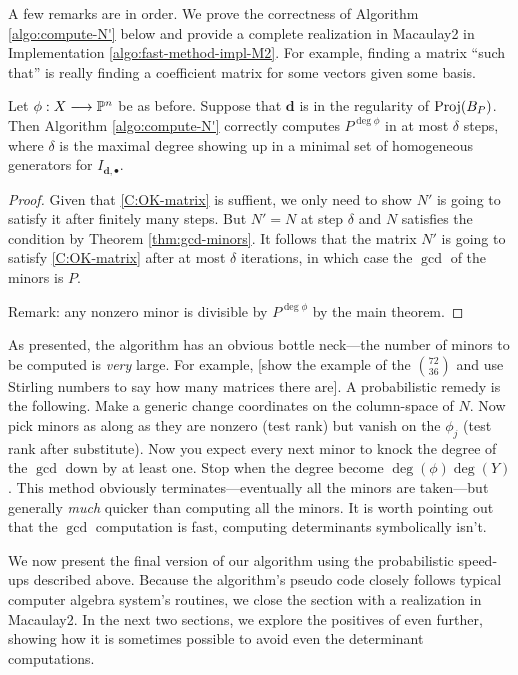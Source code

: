 \documentclass[fleqn,reqno]{amsart}
\numberwithin{first}{chapter}
\begin{document}
\begin{paragraf}
A few remarks are in order.
We prove the correctness of Algorithm \ref{algo:compute-N'} below and provide a complete realization
in Macaulay2 in Implementation \ref{algo:fast-method-impl-M2}.
For example, finding a matrix ``such that'' is really finding a coefficient matrix for some
vectors given some basis.
\end{paragraf}

\begin{theorem}
\label{thm:algo-proof-of-correctness}
Let $\phi:X\longrightarrow\mathbb{P}^n$ be as before. Suppose that $\mathbf d$ is in the regularity of $\operatorname{Proj}(B_P)$.
Then Algorithm \ref{algo:compute-N'} correctly computes $P^{\deg\phi}$
in at most $\delta$ steps, where $\delta$ is the maximal degree showing up in a minimal set of homogeneous
generators for $I_{\mathbf d,\bullet}$.
\end{theorem}

\begin{proof}
Given that \ref{C:OK-matrix} is suffient, we only need to show $N'$ is going to
satisfy it after finitely many steps.
But $N'=N$ at step $\delta$ and $N$ satisfies the condition by Theorem \ref{thm:gcd-minors}.
It follows that the matrix $N'$ is going to satisfy \ref{C:OK-matrix} after at most $\delta$ iterations,
in which case the $\gcd$ of the minors is $P$.

Remark: any nonzero minor is divisible by $P^{\deg\phi}$ by the main theorem.
\end{proof}

\begin{paragraf}
As presented, the algorithm has an obvious bottle neck---the number of minors to be computed is {\em very}
large. For example, [show the example of the $\binom{72}{36}$ and use Stirling numbers to say how many matrices there are].
A probabilistic remedy is the following.
Make a generic change coordinates on the column-space of $N$.
Now pick minors as along as they are nonzero (test rank) but vanish on the $\phi_j$ (test rank after substitute).
Now you expect every next minor to knock the degree of the $\gcd$ down by at least one.
Stop when the degree become $\deg(\phi)\deg(Y)$.
This method obviously terminates---eventually all the minors are taken---but generally {\em much} quicker than
computing all the minors.
It is worth pointing out that the $\gcd$ computation is fast, computing determinants symbolically isn't.
\end{paragraf}

\begin{paragraf}
We now present the final version of our algorithm using the probabilistic speed-ups described above.
Because the algorithm's pseudo code closely follows typical computer algebra system's routines,
we close the section with a realization in Macaulay2.
In the next two sections, we explore the positives of even further, showing how it is sometimes
possible to avoid even the determinant computations.
\end{paragraf}
\end{document}
